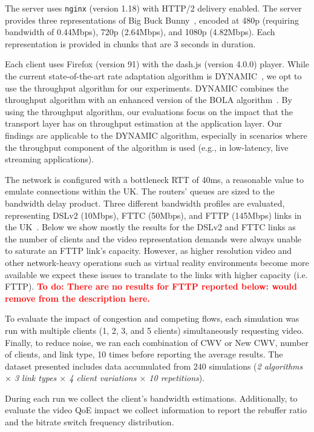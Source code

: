 \documentclass[10pt,sigconf,anonymous]{acmart}
\newcommand{\todo}[1]{\textbf{\textcolor{red}{To do: #1}}}
\begin{document}
The server uses \texttt{nginx} (version 1.18) with HTTP/2 delivery enabled. The server provides three representations of Big Buck Bunny~\cite{online-bbb}, encoded at 480p (requiring bandwidth of 0.44Mbps), 720p (2.64Mbps), and 1080p (4.82Mbps). Each representation is provided in chunks that are 3 seconds in duration.

Each client uses Firefox (version 91) with the dash.js (version 4.0.0) player. While the current state-of-the-art rate adaptation algorithm is DYNAMIC~\cite{Spiteri-2019-from-theory-to-practice-sabre}, we opt to use the throughput algorithm for our experiments. DYNAMIC combines the throughput algorithm with an enhanced version of the BOLA algorithm~\cite{Spiteri-2016-BOLA}. By using the throughput algorithm, our evaluations focus on the impact that the transport layer has on throughput estimation at the application layer. Our findings are applicable to the DYNAMIC algorithm, especially in scenarios where the throughput component of the algorithm is used (e.g., in low-latency, live streaming applications).

The network is configured with a bottleneck RTT of 40ms, a reasonable value to emulate connections within the UK. The routers' queues are sized to the bandwidth delay product. Three different bandwidth profiles are evaluated, representing DSLv2 (10Mbps), FTTC (50Mbps), and FTTP (145Mbps) links in the UK~\cite{online-ofcom-report}. Below we show mostly the results for the DSLv2 and FTTC links as the number of clients and the video representation demands were always unable to saturate an FTTP link's capacity. However, as higher resolution video and other network-heavy operations such as virtual reality environments become more available we expect these issues to translate to the links with higher capacity (i.e. FTTP). \todo{There are no results for FTTP reported below: would remove from the description here.}

To evaluate the impact of congestion and competing flows, each simulation was run with multiple clients (1, 2, 3, and 5 clients) simultaneously requesting video. Finally, to reduce noise, we ran each combination of CWV or New CWV, number of clients, and link type, 10 times before reporting the average results. The dataset presented includes data accumulated from 240 simulations (\emph{2 algorithms $\times$ 3 link types $\times$ 4 client variations $\times$ 10 repetitions}). 

During each run we collect the client's bandwidth estimations. Additionally, to evaluate the video QoE impact we collect information to report the rebuffer ratio and the bitrate switch frequency distribution.
\end{document}
